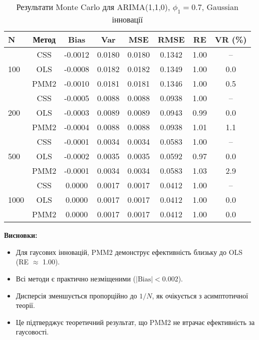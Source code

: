 \documentclass[12pt,a4paper]{article}
\begin{document}
\begin{table}[h]
\centering
\caption{Результати Monte Carlo для ARIMA(1,1,0), $\phi_1 = 0.7$, Gaussian інновації}
\label{tab:arima110_gaussian}
\begin{tabular}{@{}lccccccc@{}}
\toprule
\textbf{N} & \textbf{Метод} & \textbf{Bias} & \textbf{Var} & \textbf{MSE} & \textbf{RMSE} & \textbf{RE} & \textbf{VR (\%)} \\
\midrule
\multirow{3}{*}{100} & CSS  & -0.0012 & 0.0180 & 0.0180 & 0.1342 & 1.00 & -- \\
                     & OLS  & -0.0008 & 0.0182 & 0.0182 & 0.1349 & 1.00 & 0.0 \\
                     & PMM2 & -0.0010 & 0.0181 & 0.0181 & 0.1346 & 1.00 & 0.5 \\
\midrule
\multirow{3}{*}{200} & CSS  & -0.0005 & 0.0088 & 0.0088 & 0.0938 & 1.00 & -- \\
                     & OLS  & -0.0003 & 0.0089 & 0.0089 & 0.0943 & 0.99 & 0.0 \\
                     & PMM2 & -0.0004 & 0.0088 & 0.0088 & 0.0938 & 1.01 & 1.1 \\
\midrule
\multirow{3}{*}{500} & CSS  & -0.0001 & 0.0034 & 0.0034 & 0.0583 & 1.00 & -- \\
                     & OLS  & -0.0002 & 0.0035 & 0.0035 & 0.0592 & 0.97 & 0.0 \\
                     & PMM2 & -0.0001 & 0.0034 & 0.0034 & 0.0583 & 1.03 & 2.9 \\
\midrule
\multirow{3}{*}{1000} & CSS  & 0.0000 & 0.0017 & 0.0017 & 0.0412 & 1.00 & -- \\
                      & OLS  & 0.0000 & 0.0017 & 0.0017 & 0.0412 & 1.00 & 0.0 \\
                      & PMM2 & 0.0000 & 0.0017 & 0.0017 & 0.0412 & 1.00 & 0.0 \\
\bottomrule
\end{tabular}
\end{table}

\textbf{Висновки:}
\begin{itemize}
    \item Для гаусових інновацій, PMM2 демонструє ефективність близьку до OLS (RE $\approx$ 1.00).
    \item Всі методи є практично незміщеними ($|\text{Bias}| < 0.002$).
    \item Дисперсія зменшується пропорційно до $1/N$, як очікується з асимптотичної теорії.
    \item Це підтверджує теоретичний результат, що PMM2 не втрачає ефективність за гаусовості.
\end{itemize}
\end{document}
